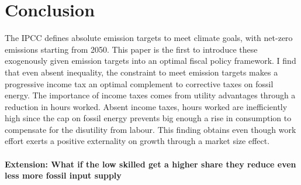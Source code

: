 \section{Conclusion}\label{sec:con}

\begin{comment}
	content...
\tr{In contrast to \cite{Acemoglu2012TheChange}, perceiving dirty output as the source of the externality is misleading in my model: As productivity in this sector rises, so does the externality. Instead, one could think of one input factor to dirty production (i.e. energy) which causes pollution, then a more productive technology can generate more output at a lower externality. \\
Substitutability as the focus of technological advancement: (a) the economy grows as more clean goods can be used to replace dirty goods; this corresponds to less emissions in the final good production. (b) or progress on dirtiness of energy use...CONSULT \cite{Acemoglu2012TheChange} who discuss distinct forms of progress. }

\end{comment}

The IPCC defines absolute emission targets to meet climate goals, with net-zero emissions starting from 2050. This paper is the first to introduce these exogenously given emission targets into an optimal fiscal policy framework. I find that even absent inequality, the constraint to meet emission targets makes a progressive income tax an optimal complement to corrective taxes on fossil energy. 
The importance of income taxes comes from utility advantages through a reduction in hours worked. Absent income taxes, hours worked are inefficiently high since the cap on fossil energy prevents big enough a rise in consumption to compensate for the disutility from labour. 
This finding obtains even though work effort exerts a positive externality on growth through a market size effect. 

\paragraph{Extension: What if the low skilled get a higher share \ar they reduce even less \ar more fossil input supply}


